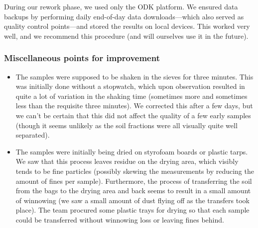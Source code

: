 \documentclass[a4paper,12pt]{article}
\begin{document}
During our rework phase, we used only the ODK platform. We ensured data backups by performing daily end-of-day data downloads---which also served as quality control points---and stored the results on local devices. This worked very well, and we recommend this procedure (and will ourselves use it in the future).

\subsubsection{Miscellaneous points for improvement}
\begin{itemize}
  \item The samples were supposed to be shaken in the sieves for three minutes. This was initially done without a stopwatch, which upon observation resulted in quite a lot of variation in the shaking time (sometimes more and sometimes less than the requisite three minutes). We corrected this after a few days, but we can't be certain that this did not affect the quality of a few early samples (though it seems unlikely as the soil fractions were all visually quite well separated).
  \item The samples were initially being dried on styrofoam boards or plastic tarps. We saw that this process leaves residue on the drying area, which visibly tends to be fine particles (possibly skewing the measurements by reducing the amount of fines per sample). Furthermore, the process of transferring the soil from the bags to the drying area and back seems to result in a small amount of winnowing (we saw a small amount of dust flying off as the transfers took place). The team procured some plastic trays for drying so that each sample could be transferred without winnowing loss or leaving fines behind.
\end{itemize}
\end{document}
